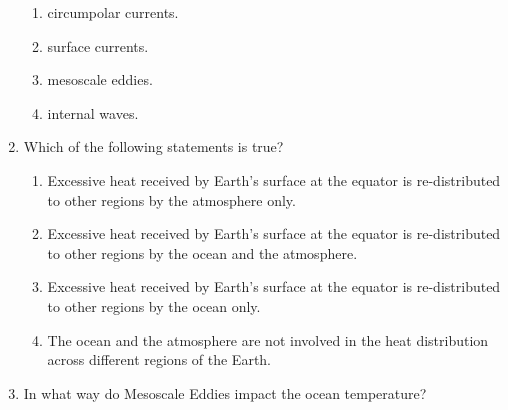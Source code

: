 \documentclass{report}
\begin{document}
\begin{enumerate}
    \begin{enumerate}
        \item   circumpolar currents. 
        \item   surface currents. 
        \item   mesoscale eddies. 
        \item   internal waves. 
    \end{enumerate}
    \item Which of the following statements is true?
    \begin{enumerate}
        \item Excessive heat received by Earth’s surface at the equator is re-distributed to other regions by the atmosphere only.
        \item Excessive heat received by Earth’s surface at the equator is re-distributed to other regions by the ocean and the atmosphere.
        \item Excessive heat received by Earth’s surface at the equator is re-distributed to other regions by the ocean only.
        \item The ocean and the atmosphere are not involved in the heat distribution across different regions of the Earth.
    \end{enumerate}
    \item In what way do Mesoscale Eddies impact the ocean temperature?


\end{enumerate}
\end{document}
